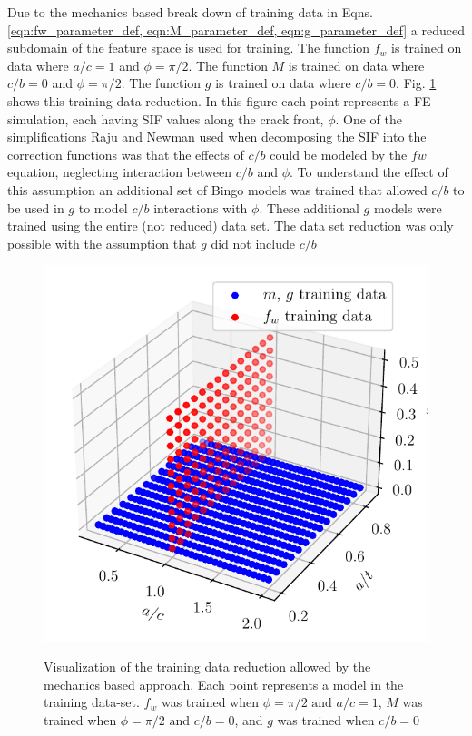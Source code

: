 Due to the mechanics based break down of training data in Eqns. \ref{eqn:fw_parameter_def, eqn:M_parameter_def, eqn:g_parameter_def} a reduced subdomain of the feature space is used for training. The function $f_w$ is trained on data where $a/c = 1$ and $\phi = \pi/2$. The function $M$ is trained on data where $c/b = 0$ and $\phi = \pi/2$. The function $g$ is trained on data where $c/b = 0$. Fig. \ref{fig:training_models_3d} shows this training data reduction. In this figure each point represents a FE simulation, each having SIF values along the crack front, $\phi$. One of the simplifications Raju and Newman used when decomposing the SIF into the correction functions was that the effects of $c/b$ could be modeled by the $fw$ equation, neglecting interaction between $c/b$ and $\phi$. To understand the effect of this assumption an  additional set of Bingo models was trained that allowed $c/b$ to be used in $g$ to model $c/b$ interactions with  $\phi$. These additional $g$ models were trained using the entire (not reduced) data set. The data set reduction was only possible with the assumption that $g$ did not include $c/b$

\begin{figure}
    \centering
    \includegraphics[width=\textwidth]{Figures_pdf/training_slices.pdf}
    \label{fig:training_models_3d}
    \caption{Visualization of the training data reduction allowed by the mechanics based approach. Each point represents a model in the training data-set. $f_w$ was trained when $\phi = \pi/2 \text{ and } a/c = 1$, $M$ was trained when $\phi=\pi/2 \text{ and } c/b = 0$, and $g$ was trained when $c/b = 0$ }
\end{figure}


